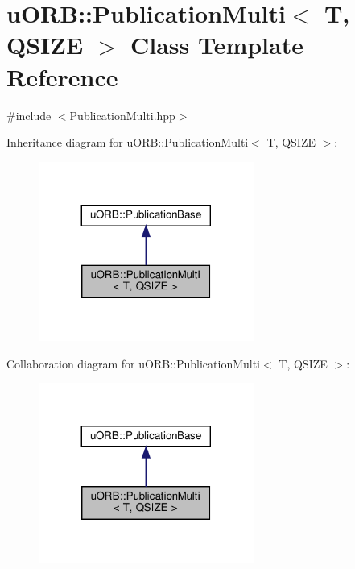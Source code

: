 \hypertarget{classuORB_1_1PublicationMulti}{}\section{u\+O\+RB\+:\+:Publication\+Multi$<$ T, Q\+S\+I\+ZE $>$ Class Template Reference}
\label{classuORB_1_1PublicationMulti}


{\ttfamily \#include $<$Publication\+Multi.\+hpp$>$}



Inheritance diagram for u\+O\+RB\+:\+:Publication\+Multi$<$ T, Q\+S\+I\+ZE $>$\+:\nopagebreak
\begin{figure}[H]
\begin{center}
\leavevmode
\includegraphics[width=200pt]{d7/df4/classuORB_1_1PublicationMulti__inherit__graph}
\end{center}
\end{figure}


Collaboration diagram for u\+O\+RB\+:\+:Publication\+Multi$<$ T, Q\+S\+I\+ZE $>$\+:\nopagebreak
\begin{figure}[H]
\begin{center}
\leavevmode
\includegraphics[width=200pt]{d0/d47/classuORB_1_1PublicationMulti__coll__graph}
\end{center}
\end{figure}
